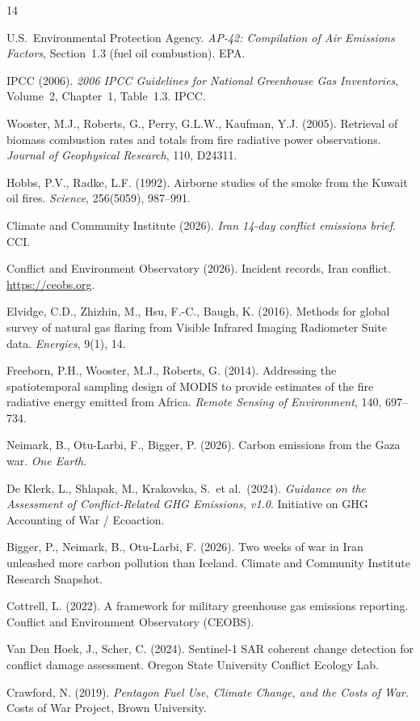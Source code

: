 \documentclass[11pt]{article}
\begin{document}
\begin{thebibliography}{14}

  U.S.\ Environmental Protection Agency.
  \emph{AP-42: Compilation of Air Emissions Factors},
  Section~1.3 (fuel oil combustion). EPA.

  IPCC (2006).
  \emph{2006 IPCC Guidelines for National Greenhouse Gas Inventories},
  Volume~2, Chapter~1, Table~1.3. IPCC.

  Wooster, M.J., Roberts, G., Perry, G.L.W., Kaufman, Y.J. (2005).
  Retrieval of biomass combustion rates and totals from fire radiative
  power observations.
  \emph{Journal of Geophysical Research}, 110, D24311.

  Hobbs, P.V., Radke, L.F. (1992).
  Airborne studies of the smoke from the Kuwait oil fires.
  \emph{Science}, 256(5059), 987--991.

  Climate and Community Institute (2026).
  \emph{Iran 14-day conflict emissions brief}. CCI.

  Conflict and Environment Observatory (2026).
  Incident records, Iran conflict.
  \url{https://ceobs.org}.

  Elvidge, C.D., Zhizhin, M., Hsu, F.-C., Baugh, K. (2016).
  Methods for global survey of natural gas flaring from Visible Infrared
  Imaging Radiometer Suite data.
  \emph{Energies}, 9(1), 14.

  Freeborn, P.H., Wooster, M.J., Roberts, G. (2014).
  Addressing the spatiotemporal sampling design of MODIS to provide
  estimates of the fire radiative energy emitted from Africa.
  \emph{Remote Sensing of Environment}, 140, 697--734.

  Neimark, B., Otu-Larbi, F., Bigger, P. (2026).
  Carbon emissions from the Gaza war.
  \emph{One Earth}.

  De Klerk, L., Shlapak, M., Krakovska, S.\ et al.\ (2024).
  \emph{Guidance on the Assessment of Conflict-Related GHG Emissions,
  v1.0}. Initiative on GHG Accounting of War / Ecoaction.

  Bigger, P., Neimark, B., Otu-Larbi, F. (2026).
  Two weeks of war in Iran unleashed more carbon pollution than Iceland.
  Climate and Community Institute Research Snapshot.

  Cottrell, L. (2022).
  A framework for military greenhouse gas emissions reporting.
  Conflict and Environment Observatory (CEOBS).

  Van Den Hoek, J., Scher, C. (2024).
  Sentinel-1 SAR coherent change detection for conflict damage assessment.
  Oregon State University Conflict Ecology Lab.

  Crawford, N. (2019).
  \emph{Pentagon Fuel Use, Climate Change, and the Costs of War}.
  Costs of War Project, Brown University.

\end{thebibliography}
\end{document}
